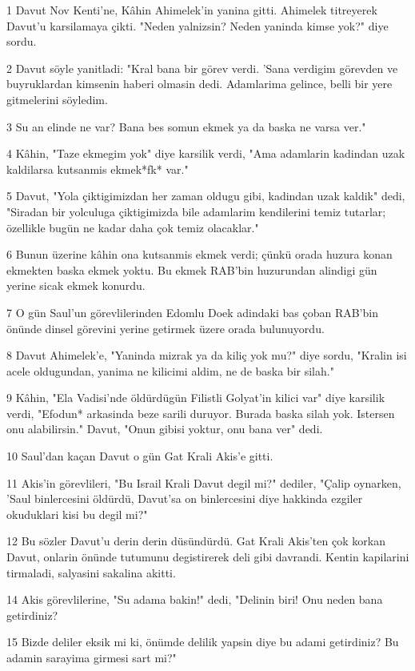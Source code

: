 \par 1 Davut Nov Kenti'ne, Kâhin Ahimelek'in yanina gitti. Ahimelek titreyerek Davut'u karsilamaya çikti. "Neden yalnizsin? Neden yaninda kimse yok?" diye sordu.
\par 2 Davut söyle yanitladi: "Kral bana bir görev verdi. 'Sana verdigim görevden ve buyruklardan kimsenin haberi olmasin dedi. Adamlarima gelince, belli bir yere gitmelerini söyledim.
\par 3 Su an elinde ne var? Bana bes somun ekmek ya da baska ne varsa ver."
\par 4 Kâhin, "Taze ekmegim yok" diye karsilik verdi, "Ama adamlarin kadindan uzak kaldilarsa kutsanmis ekmek*fk* var."
\par 5 Davut, "Yola çiktigimizdan her zaman oldugu gibi, kadindan uzak kaldik" dedi, "Siradan bir yolculuga çiktigimizda bile adamlarim kendilerini temiz tutarlar; özellikle bugün ne kadar daha çok temiz olacaklar."
\par 6 Bunun üzerine kâhin ona kutsanmis ekmek verdi; çünkü orada huzura konan ekmekten baska ekmek yoktu. Bu ekmek RAB'bin huzurundan alindigi gün yerine sicak ekmek konurdu.
\par 7 O gün Saul'un görevlilerinden Edomlu Doek adindaki bas çoban RAB'bin önünde dinsel görevini yerine getirmek üzere orada bulunuyordu.
\par 8 Davut Ahimelek'e, "Yaninda mizrak ya da kiliç yok mu?" diye sordu, "Kralin isi acele oldugundan, yanima ne kilicimi aldim, ne de baska bir silah."
\par 9 Kâhin, "Ela Vadisi'nde öldürdügün Filistli Golyat'in kilici var" diye karsilik verdi, "Efodun* arkasinda beze sarili duruyor. Burada baska silah yok. Istersen onu alabilirsin." Davut, "Onun gibisi yoktur, onu bana ver" dedi.
\par 10 Saul'dan kaçan Davut o gün Gat Krali Akis'e gitti.
\par 11 Akis'in görevlileri, "Bu Israil Krali Davut degil mi?" dediler, "Çalip oynarken, 'Saul binlercesini öldürdü, Davut'sa on binlercesini diye hakkinda ezgiler okuduklari kisi bu degil mi?"
\par 12 Bu sözler Davut'u derin derin düsündürdü. Gat Krali Akis'ten çok korkan Davut, onlarin önünde tutumunu degistirerek deli gibi davrandi. Kentin kapilarini tirmaladi, salyasini sakalina akitti.
\par 14 Akis görevlilerine, "Su adama bakin!" dedi, "Delinin biri! Onu neden bana getirdiniz?
\par 15 Bizde deliler eksik mi ki, önümde delilik yapsin diye bu adami getirdiniz? Bu adamin sarayima girmesi sart mi?"

